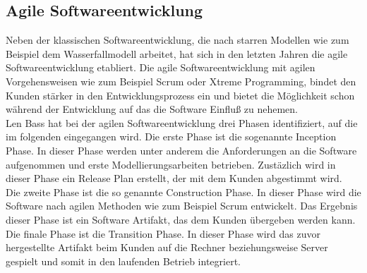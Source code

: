\subsection{Agile Softwareentwicklung}
Neben der klassischen Softwareentwicklung, die nach starren Modellen wie zum Beispiel dem Wasserfallmodell arbeitet, hat sich in den letzten Jahren die agile Softwareentwicklung etabliert. Die agile Softwareentwicklung mit agilen Vorgehensweisen wie zum Beispiel Scrum oder Xtreme Programming, bindet den Kunden stärker in den Entwicklungsprozess ein und bietet die Möglichkeit schon während der Entwicklung auf das die Software Einfluß zu nehemen. \\
Len Bass hat bei der agilen Softwareentwicklung drei Phasen identifiziert, auf die im folgenden eingegangen wird. Die erste Phase ist die sogenannte Inception Phase. In dieser Phase werden unter anderem die Anforderungen an die Software aufgenommen und erste Modellierungsarbeiten betrieben. Zustäzlich wird in dieser Phase ein Release Plan erstellt, der mit dem Kunden abgestimmt wird.\\
Die zweite Phase ist die so genannte Construction Phase. In dieser Phase wird die Software nach agilen Methoden wie zum Beispiel Scrum entwickelt. Das Ergebnis dieser Phase ist ein Software Artifakt, das dem Kunden übergeben werden kann. \\
Die finale Phase ist die Transition Phase. In dieser Phase wird das zuvor hergestellte Artifakt beim Kunden auf die Rechner beziehungsweise Server gespielt und somit in den laufenden Betrieb integriert.

